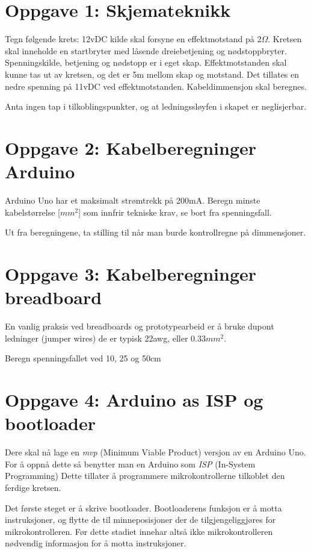 \documentclass{article}
\begin{document}
\newpage
\section*{Oppgave 1: Skjemateknikk}
Tegn følgende krets:
12vDC kilde skal forsyne en effektmotstand på $2\Omega$. Kretsen skal inneholde en startbryter med låsende dreiebetjening og nødstoppbryter. Spenningskilde, betjening og nødstopp er i eget skap. Effektmotstanden skal kunne tas ut av kretsen, og det er 5m mellom skap og motstand.
Det tillates en nedre spenning på 11vDC ved effektmotstanden. Kabeldimmensjon skal beregnes.

Anta ingen tap i tilkoblingspunkter, og at ledningssløyfen i skapet er neglisjerbar.

\section*{Oppgave 2: Kabelberegninger Arduino}
Arduino Uno har et maksimalt strømtrekk på 200mA. Beregn minste kabelstørrelse [$mm^2$] som innfrir tekniske krav, se bort fra spenningsfall.

Ut fra beregningene, ta stilling til når man burde kontrollregne på dimmensjoner.

\section*{Oppgave 3: Kabelberegninger breadboard}
En vanlig praksis ved breadboards og prototypearbeid er å bruke dupont ledninger (jumper wires) de er typisk 22awg, eller 0.33$mm^2$.

Beregn spenningsfallet ved 10, 25 og 50cm

\section*{Oppgave 4: Arduino as ISP og bootloader}
Dere skal nå lage en \emph{mvp} (Minimum Viable Product) versjon av en Arduino Uno.
For å oppnå dette så benytter man en Arduino som \emph{ISP} (In-System Programming) Dette tillater å programmere mikrokontrollerne tilkoblet den ferdige kretsen.

Det første steget er å skrive bootloader. Bootloaderens funksjon er å motta instruksjoner, og flytte de til minneposisjoner der de tilgjengeliggjøres for mikrokontrolleren. Før dette stadiet innehar altså ikke mikrokontrolleren nødvendig informasjon for å motta instruksjoner. 
\end{document}
